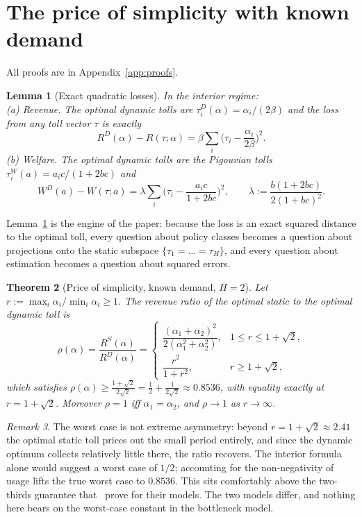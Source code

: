 \documentclass[11pt]{article}
\newtheorem{theorem}{Theorem}[section]
\newtheorem{lemma}[theorem]{Lemma}
\theoremstyle{definition}
\theoremstyle{remark}
\newtheorem{remark}[theorem]{Remark}
\begin{document}
\section{The price of simplicity with known demand}\label{sec:known}
All proofs are in Appendix~\ref{app:proofs}.

\begin{lemma}[Exact quadratic losses]\label{lem:quad}
In the interior regime:\\
(a) \emph{Revenue.} The optimal dynamic tolls are $\tau^D_i(\alpha)=\alpha_i/(2\beta)$ and the loss from any toll vector $\tau$ is exactly
\[R^D(\alpha)-R(\tau;\alpha)=\beta\sum_{i}\Big(\tau_i-\frac{\alpha_i}{2\beta}\Big)^2.\]
(b) \emph{Welfare.} The optimal dynamic tolls are the Pigouvian tolls $\tau^W_i(a)=a_ic/(1+2bc)$ and
\[W^D(a)-W(\tau;a)=\lambda\sum_i\Big(\tau_i-\frac{a_ic}{1+2bc}\Big)^2,\qquad \lambda:=\frac{b(1+2bc)}{2(1+bc)^2}.\]
\end{lemma}
Lemma~\ref{lem:quad} is the engine of the paper: because the loss is an exact squared distance to the optimal toll, every question about policy classes becomes a question about projections onto the static subspace $\{\tau_1=\dots=\tau_H\}$, and every question about estimation becomes a question about squared errors.

\begin{theorem}[Price of simplicity, known demand, $H=2$]\label{thm:known}
Let $r:=\max_i\alpha_i/\min_i\alpha_i\ge1$. The revenue ratio of the optimal static to the optimal dynamic toll is
\[\rho(\alpha)=\frac{R^S(\alpha)}{R^D(\alpha)}=\begin{cases}\dfrac{(\alpha_1+\alpha_2)^2}{2(\alpha_1^2+\alpha_2^2)},&1\le r\le1+\sqrt2,\\[8pt]\dfrac{r^2}{1+r^2},&r\ge1+\sqrt2,\end{cases}\]
which satisfies $\rho(\alpha)\ge\frac{1+\sqrt2}{2\sqrt2}=\frac12+\frac1{2\sqrt2}\approx0.8536$, with equality exactly at $r=1+\sqrt2$. Moreover $\rho=1$ iff $\alpha_1=\alpha_2$, and $\rho\to1$ as $r\to\infty$.
\end{theorem}

\begin{remark}\label{rem:corner}
The worst case is not extreme asymmetry: beyond $r=1+\sqrt2\approx2.41$ the optimal static toll prices out the small period entirely, and since the dynamic optimum collects relatively little there, the ratio recovers. The interior formula alone would suggest a worst case of $1/2$; accounting for the non-negativity of usage lifts the true worst case to $0.8536$. This sits comfortably above the two-thirds guarantee that~\cite{jde2026} prove for their models. The two models differ, and nothing here bears on the worst-case constant in the bottleneck model.
\end{remark}
\end{document}

